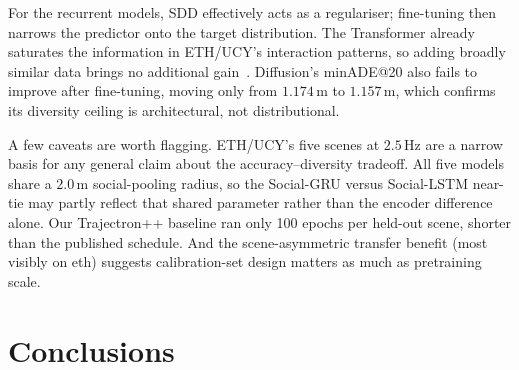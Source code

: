 \documentclass[conference]{IEEEtran}
\begin{document}
For the recurrent models, SDD effectively acts as a regulariser;
fine-tuning then narrows the predictor onto the target distribution.
The Transformer already saturates the information in ETH/UCY's
interaction patterns, so adding broadly similar data brings no
additional gain~\cite{kornblith2019better}.  Diffusion's minADE@20
also fails to improve after fine-tuning, moving only from $1.174$\,m
to $1.157$\,m, which confirms its diversity ceiling is architectural,
not distributional.

A few caveats are worth flagging.  ETH/UCY's five scenes at $2.5$\,Hz
are a narrow basis for any general claim about the accuracy--diversity
tradeoff.  All five models share a $2.0$\,m social-pooling radius, so
the Social-GRU versus Social-LSTM near-tie may partly reflect that
shared parameter rather than the encoder difference alone.  Our
Trajectron++ baseline ran only 100 epochs per held-out scene, shorter
than the published schedule.  And the scene-asymmetric transfer benefit
(most visibly on eth) suggests calibration-set design matters as much as
pretraining scale.

\section{Conclusions}



\end{document}
